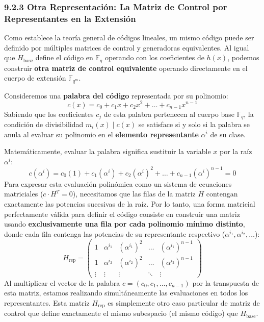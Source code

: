 \documentclass{article}
\begin{document}
\subsubsection{9.2.3 Otra Representación: La Matriz de Control por Representantes en la Extensión}
Como establece la teoría general de códigos lineales, un mismo código puede ser definido por múltiples matrices de control y generadoras equivalentes. Al igual que $H_{\text{base}}$ define el código en $\mathbb{F}_q$ operando con los coeficientes de $h(x)$, podemos construir \textbf{otra matriz de control equivalente} operando directamente en el cuerpo de extensión $\mathbb{F}_{q^m}$.

Consideremos una \textbf{palabra del código} representada por su polinomio: 
\[
c(x) = c_0 + c_1x + c_2x^2 + \dots + c_{n-1}x^{n-1}
\]
Sabiendo que los coeficientes $c_j$ de esta palabra pertenecen al cuerpo base $\mathbb{F}_q$, la condición de divisibilidad $m_i(x) \mid c(x)$ se satisface si y solo si la palabra se anula al evaluar su polinomio en el \textbf{elemento representante} $\alpha^i$ de su clase. 

Matemáticamente, evaluar la palabra significa sustituir la variable $x$ por la raíz $\alpha^i$:
\[
c(\alpha^i) = c_0(1) + c_1(\alpha^i) + c_2(\alpha^i)^2 + \dots + c_{n-1}(\alpha^i)^{n-1} = 0
\]
Para expresar esta evaluación polinómica como un sistema de ecuaciones matriciales ($c \cdot H^T = 0$), necesitamos que las filas de la matriz $H$ contengan exactamente las potencias sucesivas de la raíz. Por lo tanto, una forma matricial perfectamente válida para definir el código consiste en construir una matriz usando \textbf{exclusivamente una fila por cada polinomio mínimo distinto}, donde cada fila contenga las potencias de su representante respectivo ($\alpha^{i_1}, \alpha^{i_2}, \dots$):
\[
H_{\text{rep}} = \begin{pmatrix}
1 & \alpha^{i_1} & (\alpha^{i_1})^2 & \dots & (\alpha^{i_1})^{n-1} \\
1 & \alpha^{i_2} & (\alpha^{i_2})^2 & \dots & (\alpha^{i_2})^{n-1} \\
\vdots & \vdots & \vdots & \ddots & \vdots
\end{pmatrix}
\]
Al multiplicar el vector de la palabra $c = (c_0, c_1, \dots, c_{n-1})$ por la transpuesta de esta matriz, estamos realizando simultáneamente las evaluaciones en todos los representantes. Esta matriz $H_{\text{rep}}$ es simplemente otro caso particular de matriz de control que define exactamente el mismo subespacio (el mismo código) que $H_{\text{base}}$.
\end{document}
